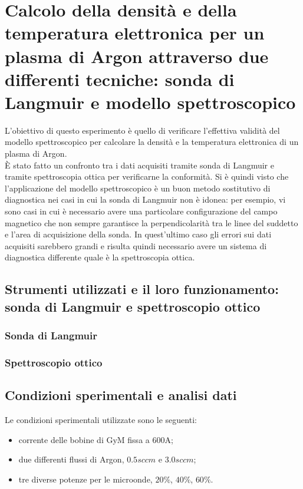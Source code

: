 \chapter{Calcolo della densità e della temperatura elettronica per un plasma di Argon attraverso due differenti tecniche: sonda di Langmuir e modello spettroscopico}


L'obiettivo di questo esperimento è quello di verificare l'effettiva validità del modello spettroscopico per calcolare la densità e la temperatura elettronica di un plasma di Argon.\\
\`E stato fatto un confronto tra i dati acquisiti tramite sonda di Langmuir e tramite spettroscopia ottica per verificarne la conformità. Si è quindi visto che 
l'applicazione del modello spettroscopico è un buon metodo sostitutivo di diagnostica nei casi in cui la sonda di Langmuir non è idonea: per esempio, vi sono casi in cui è necessario 
avere una particolare configurazione del campo magnetico che non sempre garantisce la perpendicolarità tra le linee del suddetto e l'area di acquisizione della sonda. In quest'ultimo
caso gli errori sui dati acquisiti sarebbero grandi e risulta quindi necessario avere un sistema di diagnostica differente quale è la spettroscopia ottica.

\section{Strumenti utilizzati e il loro funzionamento: sonda di Langmuir e spettroscopio ottico}
\label{sec:strumenti}
\subsection{Sonda di Langmuir}
\subsection{Spettroscopio ottico}

\section{Condizioni sperimentali e analisi dati}
Le condizioni sperimentali utilizzate sono le seguenti:
\begin{itemize}
 \item corrente delle bobine di GyM fissa a $600\si{\ampere}$;
 \item due differenti flussi di Argon, $0.5sccm$ e $3.0sccm$;
 \item tre diverse potenze per le microonde, $20\%$, $40\%$, $60\%$.
\end{itemize}

